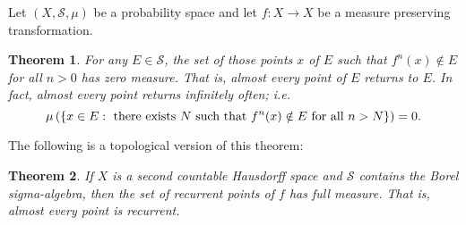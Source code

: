 \documentclass[12pt]{article}
\newtheorem{theorem}{Theorem}
\begin{document}
Let $(X,\mathscr{S},\mu)$ be a probability space and let $f\colon X\to X$
be a measure preserving transformation.

\begin{theorem} For any $E\in \mathscr{S}$,
the set of those points $x$ of $E$ such that $f^n(x)\notin E$ for all
$n>0$ has zero measure. That is, almost every point of $E$ returns to
$E$. In fact, almost every point returns infinitely often; i.e.
$$\mu\left(\{x\in E:\textnormal{ there exists } N \textnormal{
such that }f^n(x)\notin E \textnormal{ for all } n>N\}\right)=0.$$
\end{theorem}

The following is a topological version of this theorem:

\begin{theorem} If $X$ is a second countable Hausdorff space and
$\mathscr{S}$ contains the Borel sigma-algebra, then the
set of recurrent points of $f$ has full measure. That is, almost every
point is recurrent.
\end{theorem}
\end{document}
